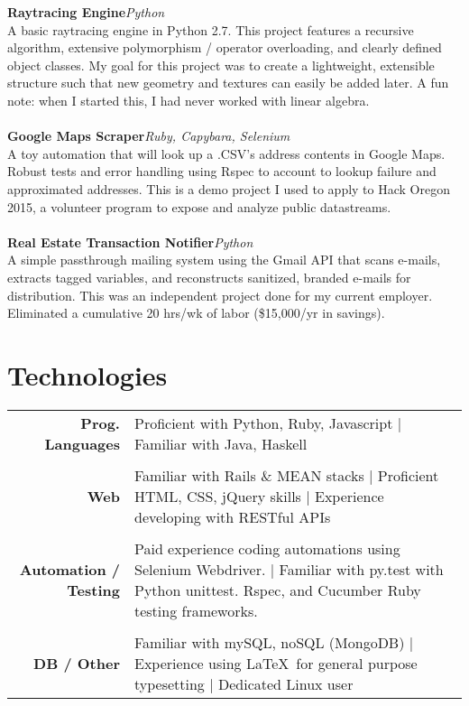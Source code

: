 \documentclass[11pt,line,centered]{res}
\begin{document}
\begin{resume}
    \footnotesize{\bfseries Raytracing Engine}\hfill \textit {Python}\\
        A basic raytracing engine in Python 2.7. This project features a recursive algorithm, extensive polymorphism
        / operator overloading, and clearly defined object classes. My goal for this project was to create a lightweight,
        extensible structure such that new geometry and textures can easily be added later. A fun note: when I
        started this, I had never worked with linear algebra.\\
    \\
    \footnotesize {\bfseries Google Maps Scraper}\hfill \textit {Ruby, Capybara, Selenium}\\
        A toy automation that will look up a .CSV’s address contents in Google Maps. Robust tests and error
        handling using Rspec to account to lookup failure and approximated addresses. This is a demo project I
        used to apply to Hack Oregon 2015, a volunteer program to expose and analyze public datastreams.\\
    \\
    \footnotesize{\bfseries  Real Estate Transaction Notifier}\hfill \textit {Python}\\
        A simple passthrough mailing system using the Gmail API that scans e-mails, extracts tagged variables,
        and reconstructs sanitized, branded e-mails for distribution. This was an independent project done for my
        current employer. Eliminated a cumulative 20 hrs/wk of labor (\$15,000/yr in savings).\\

\section{\sectionfont\normalsize Technologies}
    \vspace{1em}

    \begin{tabulary}{\textwidth}{RJ}
        \footnotesize {\bfseries Prog. Languages} & Proficient with Python, Ruby, Javascript | Familiar with Java, Haskell\\
        \\

        \footnotesize{\bfseries Web} & Familiar with Rails \& MEAN stacks | Proficient HTML, CSS, jQuery skills | Experience developing with RESTful APIs\\
        \\

        \footnotesize{\bfseries Automation / Testing} & Paid experience coding automations using Selenium Webdriver. | Familiar with py.test with Python unittest. Rspec, and Cucumber Ruby testing frameworks.\\
        \\

        \footnotesize{\bfseries DB / Other} & Familiar with mySQL, noSQL (MongoDB) | Experience using \LaTeX\ for general purpose typesetting | Dedicated Linux user\\

    \end{tabulary}

\end{resume}
\end{document}
